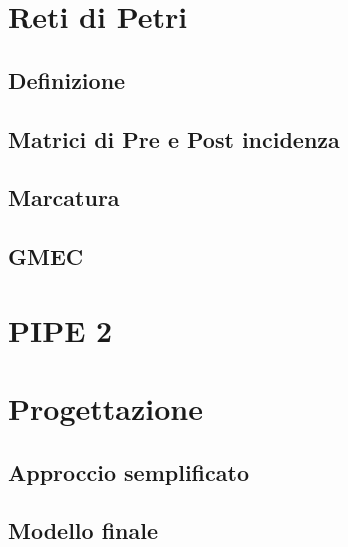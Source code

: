 \chapter{Reti di Petri}
\label{cap:cap1}
\lhead{\textbf{\rightmark}}


\section{Definizione}
\label{sec:1.1}

\newpage

\section{Matrici di Pre e Post incidenza}
\label{sec:1.2}

\newpage

\section{Marcatura}
\label{sec:1.3}

\newpage

\section{GMEC}
\label{sec:1.4}

\newpage


\chapter{PIPE 2}
\label{cap:cap2}
\lhead{\textbf{\rightmark}}

\newpage


\chapter{Progettazione}
\label{cap:cap3}
\lhead{\textbf{\rightmark}}


\section{Approccio semplificato}
\label{sec:3.1}

\newpage

\section{Modello finale}
\label{sec:3.2}

\newpage


